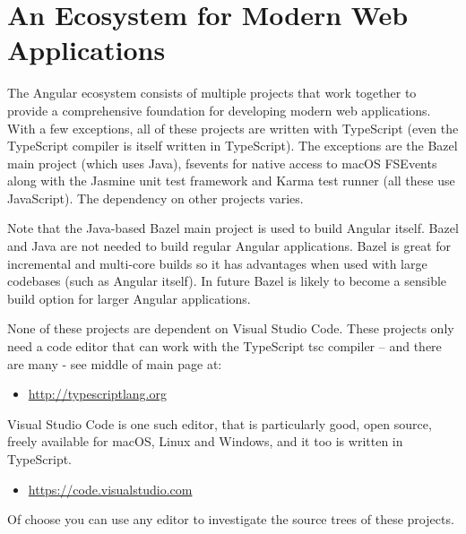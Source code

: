 \section{An Ecosystem for Modern Web Applications}

The Angular ecosystem consists of multiple projects that work together to provide a
comprehensive foundation for developing modern web applications.  With a few
exceptions, all of these projects are written with TypeScript (even the TypeScript
compiler is itself written in TypeScript). The exceptions are the Bazel main project
(which uses Java), fsevents for native access to macOS FSEvents along with the
Jasmine unit test framework and Karma test runner (all these use JavaScript). The
dependency on other projects varies.

Note that the Java-based Bazel main project is used to build Angular itself. Bazel and
Java are not needed to build regular Angular applications. Bazel is great for
incremental and multi-core builds so it has advantages when used with large
codebases (such as Angular itself). In future Bazel is likely to become a sensible build
option for larger Angular applications.

None of these projects are dependent on Visual Studio Code. These projects only need
a code editor that can work with the TypeScript tsc compiler – and there are many -
see middle of main page at:

\begin{itemize}
  \item \url{http://typescriptlang.org}
\end{itemize}

Visual Studio Code is one such editor, that is particularly good, open source, freely
available for macOS, Linux and Windows, and it too is written in TypeScript.

\begin{itemize}
  \item \url{https://code.visualstudio.com}
\end{itemize}

Of choose you can use any editor to investigate the source trees of these projects.


